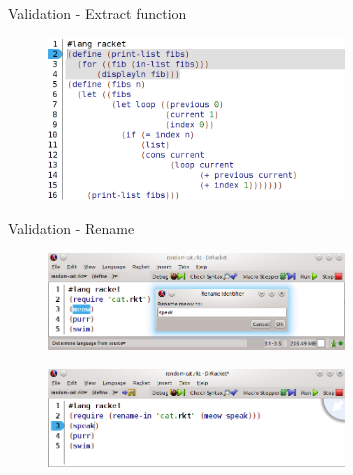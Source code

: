 \documentclass[xcolor=dvipsnames, 14pt]{beamer}
\begin{document}
\begin{frame}{Validation - Extract function}
\begin{figure}[htbp]
  \centering
  \includegraphics[width=0.7\textwidth]{img/fibonacci-After.png}
  \label{fig:fib-extract-two}
\end{figure}
\end{frame}
\begin{frame}{Validation - Rename}
\begin{figure}[htbp]
  \centering
  \includegraphics[width=0.7\textwidth]{img/renameV3-2.png}
  \label{fig:RenameCorrectBefore}
\end{figure}

\begin{figure}[htbp]
  \centering
  \includegraphics[width=0.7\textwidth]{img/renameV2-Correct-2.png}
  \label{fig:RenameCorrectAfter}
\end{figure}
\end{frame}
\end{document}
